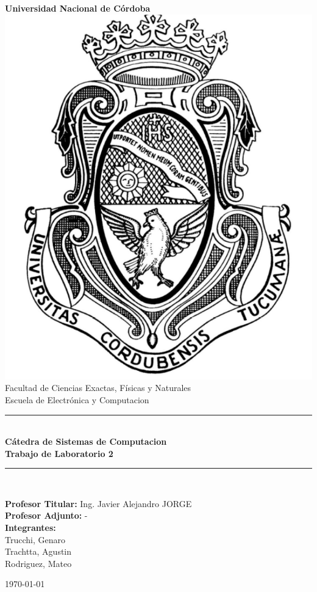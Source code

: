 \begin{titlepage}
    \begin{center}
        {\LARGE \textbf{Universidad Nacional de Córdoba}}\\[1.5cm]

        \includegraphics[scale=0.4]{images/logo2.png}\\[1.5cm]

        {\large Facultad de Ciencias Exactas, Físicas y Naturales}\\
        {\large Escuela de Electrónica y Computacion}\\[1cm]

        \rule{\linewidth}{0.5mm}\\[0.4cm]
        {\Large \textbf{Cátedra de Sistemas de Computacion}}\\[0.3cm]
        {\LARGE \textbf{Trabajo de Laboratorio 2}}\\[0.3cm]

        \rule{\linewidth}{0.5mm}\\[1cm]

        \begin{flushleft}
        {\large 
            \textbf{Profesor Titular:} Ing. Javier Alejandro JORGE\\
            \textbf{Profesor Adjunto:} -\\[0.5cm]
            \textbf{Integrantes:}\\
            Trucchi, Genaro\\
            Trachtta, Agustin\\
            Rodriguez, Mateo\\
        }
        \end{flushleft}

        \vfill

        {\large \today}
    \end{center}
\end{titlepage}
